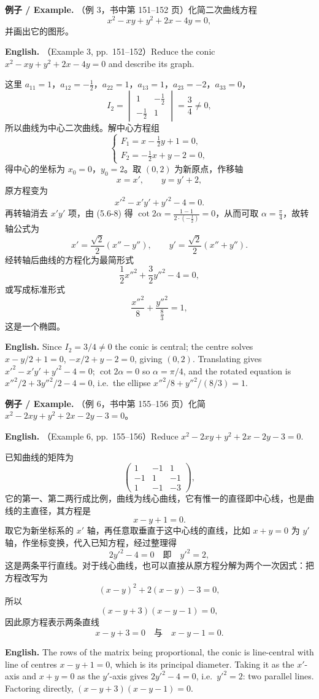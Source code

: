 \documentclass[UTF8,11pt,a4paper]{ctexart}
\newcommand{\EN}[1]{\par\noindent \textbf{English.} #1\par}
\newcommand{\EX}[2]{\par\noindent \textbf{例子 / Example.} #1\par\EN{#2}}
\theoremstyle{definition}
\begin{document}
\EX{（例 3，书中第 151--152 页）化简二次曲线方程
\[
x^2-xy+y^2+2x-4y=0,
\]
并画出它的图形。}{（Example 3, pp.~151--152）Reduce the conic $x^2-xy+y^2+2x-4y=0$ and describe its graph.}
这里 $a_{11}=1$，$a_{12}=-\frac12$，$a_{22}=1$，$a_{13}=1$，$a_{23}=-2$，$a_{33}=0$，
\[
I_2=\begin{vmatrix}1&-\frac12\\ -\frac12&1\end{vmatrix}=\frac34\ne0,
\]
所以曲线为中心二次曲线。解中心方程组
\[
\begin{cases}F_1=x-\frac12y+1=0,\\ F_2=-\frac12x+y-2=0,\end{cases}
\]
得中心的坐标为 $x_0=0$，$y_0=2$。取 $(0,2)$ 为新原点，作移轴
\[
x=x',\qquad y=y'+2,
\]
原方程变为
\[
x'^2-x'y'+y'^2-4=0.
\]
再转轴消去 $x'y'$ 项，由 (5.6-8) 得 $\cot2\alpha=\frac{1-1}{2\cdot(-\frac12)}=0$，从而可取 $\alpha=\frac{\pi}{4}$，故转轴公式为
\[
x'=\frac{\sqrt2}{2}(x''-y''),\qquad y'=\frac{\sqrt2}{2}(x''+y'').
\]
经转轴后曲线的方程化为最简形式
\[
\frac12x''^2+\frac32y''^2-4=0,
\]
或写成标准形式
\[
\frac{x''^2}{8}+\frac{y''^2}{\frac83}=1,
\]
这是一个椭圆。
\EN{Since $I_2=3/4\ne0$ the conic is central; the centre solves $x-y/2+1=0$, $-x/2+y-2=0$, giving $(0,2)$. Translating gives $x'^2-x'y'+y'^2-4=0$; $\cot2\alpha=0$ so $\alpha=\pi/4$, and the rotated equation is $x''^2/2+3y''^2/2-4=0$, i.e.\ the ellipse $x''^2/8+y''^2/(8/3)=1$.}

\EX{（例 6，书中第 155--156 页）化简 $x^2-2xy+y^2+2x-2y-3=0$。}{（Example 6, pp.~155--156）Reduce $x^2-2xy+y^2+2x-2y-3=0$.}
已知曲线的矩阵为
\[
\begin{pmatrix}1&-1&1\\ -1&1&-1\\ 1&-1&-3\end{pmatrix},
\]
它的第一、第二两行成比例，曲线为线心曲线，它有惟一的直径即中心线，也是曲线的主直径，其方程是
\[
x-y+1=0.
\]
取它为新坐标系的 $x'$ 轴，再任意取垂直于这中心线的直线，比如 $x+y=0$ 为 $y'$ 轴，作坐标变换，代入已知方程，经过整理得
\[
2y'^2-4=0\quad\text{即}\quad y'^2=2,
\]
这是两条平行直线。对于线心曲线，也可以直接从原方程分解为两个一次因式：把方程改写为
\[
(x-y)^2+2(x-y)-3=0,
\]
所以
\[
(x-y+3)(x-y-1)=0,
\]
因此原方程表示两条直线
\[
x-y+3=0\quad\text{与}\quad x-y-1=0.
\]
\EN{The rows of the matrix being proportional, the conic is line-central with line of centres $x-y+1=0$, which is its principal diameter. Taking it as the $x'$-axis and $x+y=0$ as the $y'$-axis gives $2y'^2-4=0$, i.e.\ $y'^2=2$: two parallel lines. Factoring directly, $(x-y+3)(x-y-1)=0$.}
\end{document}
